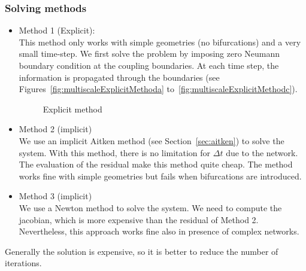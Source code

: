 \documentclass[11pt]{article}
\begin{document}
\subsubsection{Solving methods}
\begin{itemize}
\item Method 1 (Explicit):\\
This method only works with simple geometries (no bifurcations) and a very small time-step. We first solve the problem by imposing zero Neumann boundary condition at the coupling boundaries. At each time step, the information is propagated through the boundaries (see Figures~\ref{fig:multiscaleExplicitMethoda} to~\ref{fig:multiscaleExplicitMethodc}).
\begin{figure}[H]
\centering
{}
\caption{Explicit method}
\label{fig:multiscaleExplicitMethod}
\end{figure}

\item Method 2 (implicit)\\
We use an implicit Aitken method (see Section~\ref{sec:aitken}) to solve the system. With this method, there is no limitation for $\Delta t$ due to the network. The evaluation of the residual make this method quite cheap. The method works fine with simple geometries but fails when bifurcations are introduced.

\item Method 3 (implicit)\\
We use a Newton method to solve the system. We need to compute the jacobian, which is more expensive than the residual of Method 2. Nevertheless, this approach works fine also in presence of complex networks.

\end{itemize}
Generally the solution is expensive, so it is better to reduce the number of iterations.
\end{document}
